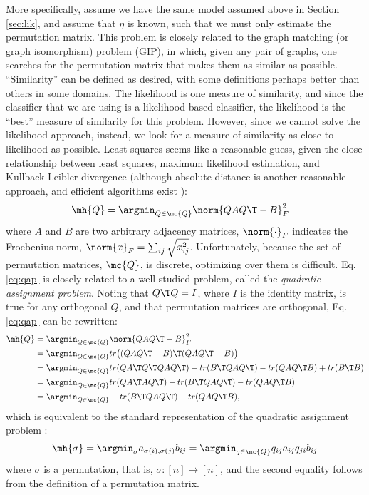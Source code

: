 More specifically, assume we have the same model assumed above in Section \ref{sec:lik}, and assume that $\eta$ is known, such that we must only estimate the permutation matrix.  This problem is closely related to the graph matching (or graph isomorphism) problem (GIP), in which, given any pair of graphs, one searches for the permutation matrix that makes them as similar as possible.  ``Similarity'' can be defined as desired, with some definitions perhaps better than others in some domains.  The likelihood is one measure of similarity, and since the classifier that we are using is a likelihood based classifier, the likelihood is the ``best'' measure of similarity for this problem.  However, since we cannot solve the likelihood approach, instead, we look for a measure of similarity as close to likelihood as possible.  Least squares seems like a reasonable guess, given the close relationship between least squares, maximum likelihood estimation, and Kullback-Leibler divergence \cite{YangPriebe10, Grunwald07} (although absolute distance is another reasonable approach, and efficient algorithms exist \cite{}):  
\begin{align} \label{eq:qap}
	\mh{Q} &= \argmin_{Q \in \mc{Q}} \norm{Q A Q\T - B}^2_F
\end{align}
where $A$ and $B$ are two arbitrary adjacency matrices, $\norm{\cdot}_{F}$ indicates the Froebenius norm, $\norm{x}_F=\sum_{ij} \sqrt{x_{ij}^2}$.  Unfortunately, because the set of permutation matrices, $\mc{Q}$, is discrete, optimizing over them is difficult.  Eq. \eqref{eq:qap} is closely related to a well studied problem, called the \emph{quadratic assignment problem}.  Noting that $Q\T Q=I$, where $I$ is the identity matrix, is true for any orthogonal $Q$, and that permutation matrices are orthogonal, Eq. \eqref{eq:qap} can be rewritten:
\begin{align} \label{eq:qap}
	\mh{Q} &= \argmin_{Q \in \mc{Q}} \norm{Q A Q\T - B}^2_F
			\\ &= \argmin_{Q \in \mc{Q}}tr\big((QAQ\T-B)\T(QAQ\T-B)\big)
			\\ &= \argmin_{Q \in \mc{Q}}tr(QA\T Q\T QA Q\T)  - tr(B\T QAQ\T) - tr(QAQ\T B) + tr(B\T B)
			\\ &= \argmin_{Q \in \mc{Q}}tr(QA\T A Q\T)  - tr(B\T QAQ\T) - tr(QAQ\T B)
			\\ &= \argmin_{Q \in \mc{Q}} - tr(B\T QAQ\T) - tr(QAQ\T B),			
\end{align}
which is equivalent to the standard representation of the quadratic assignment problem \cite{}:
\begin{align}
	\mh{\sigma}= \argmin_{\sigma} a_{\sigma(i), \sigma(j)} b_{ij} = \argmin_{q \in \mc{Q}} q_{ij} a_{ij} q_{ji} b_{ij}
\end{align}
where $\sigma$ is a permutation, that is, $\sigma: [n] \mapsto [n]$, and the second equality follows from the definition of a permutation matrix.  

